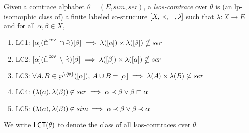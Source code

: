 \documentclass{llncs}
\begin{document}
\begin{definition} Given a comtrace alphabet $\theta=(E,sim,ser)$, a \emph{lsos-comtrace} over $\theta$ is (an lp-isomorphic class of) a finite labeled so-structure $\left[ X,\prec,\sqsubset,\lambda \right]$ such that $\lambda:X\rightarrow E$  and for all $\alpha,\beta \in X$,
\begin{enumerate}
\item[] \textsf{LC1:\mbox{\hspace{5mm}}} $[\alpha] ({\hat{\sqsubset}}^{\mathsf{cov}\;}\cap \hat{\prec}) [\beta] \implies \lambda([\alpha])\times \lambda([\beta]) \nsubseteq ser$
\item[] \textsf{LC2:\mbox{\hspace{5mm}}} $[\alpha] ({\hat{\sqsubset}}^{\mathsf{cov}\;}\setminus \hat{\prec}) [\beta] \implies \lambda([\beta])\times \lambda([\alpha]) \nsubseteq ser$
\item[] \textsf{LC3:\mbox{\hspace{5mm}}} $\forall A,B \in \wp^{\setminus \{\emptyset\}}([\alpha]),\; A\cup B = [\alpha] \implies \lambda(A)\times \lambda(B) \not \subseteq ser$
\item[] \textsf{LC4:\mbox{\hspace{5mm}}} $(\lambda(\alpha),\lambda(\beta))\not \in ser \implies \alpha \prec \beta \vee \beta \sqsubset \alpha$
\item[] \textsf{LC5:\mbox{\hspace{5mm}}} $(\lambda(\alpha),\lambda(\beta))\not\in sim \implies \alpha\prec \beta \vee \beta \prec\alpha$ 
\end{enumerate}
We write $\mathsf{LCT}(\theta)$ to denote the class of all lsos-comtraces over $\theta$. \EOD
\label{def:lcomtrace}
\end{definition}
\end{document}
